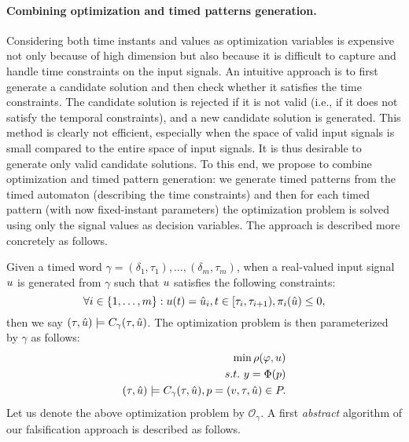 \paragraph{Combining optimization and timed patterns generation.} Considering  both time instants and values as optimization variables is expensive not only because of high dimension but also because it is difficult to capture and handle time constraints on the input signals. An intuitive approach is to first generate a candidate solution and then check whether it satisfies the time constraints. The candidate solution is rejected if it is not valid (i.e., if it does not satisfy the temporal constraints), and a new candidate solution is generated. This method is clearly not efficient, especially when the space of valid input signals is small compared to the entire space of input signals. It is thus desirable to generate only valid candidate solutions. To this end, we propose to combine optimization and timed pattern generation: we generate timed patterns from the timed automaton (describing the time constraints) and then for each timed pattern (with now fixed-instant parameters) the optimization problem is solved using only the signal values as decision variables. The approach is described more concretely as follows.

Given a timed word $\gamma = (\delta_1, \tau_1), \ldots, (\delta_m, \tau_m)$, when a real-valued input signal $u$ is generated from $\gamma$ such that $u$ satisfies the following constraints:
$$\forall i \in \{1, \ldots, m \}: u (t)= \hat{u}_i, t \in [\tau_i, \tau_{i+1}), \pi_i(\hat{u})  \le 0,$$
then we say $(\tau, \hat{u}) \models C_{\gamma}(\tau, \hat{u})$. The optimization problem is then parameterized by $\gamma$ as follows:
\begin{eqnarray} \label{eq:optim2}
\min \rho(\varphi, u) \\ \nonumber
s.t. ~y=\Phi(p) \\ \nonumber
(\tau, \hat{u}) \models C_{\gamma}(\tau, \hat{u}), p = (v, \tau, \hat{u}) \in P . \nonumber
\end{eqnarray}
Let us denote the above optimization problem by $\mathcal{O}_{\gamma}$. A first {\em abstract} algorithm of our falsification approach is described as follows.

